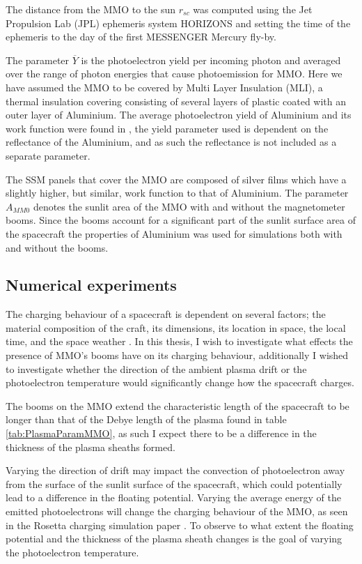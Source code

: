 The distance from the MMO to the sun $r_{sc}$ was computed using the Jet Propulsion Lab (JPL) ephemeris system HORIZONS and setting the time of the ephemeris to the day of the first MESSENGER Mercury fly-by.

The parameter $\overline{Y}$ is the photoelectron yield per incoming photon and averaged over the range of photon energies that cause photoemission for MMO. Here we have assumed the MMO to be covered by Multi Layer Insulation (MLI), a thermal insulation covering consisting of several layers of plastic coated with an outer layer of Aluminium. The average photoelectron yield of Aluminium and its work function were found in \parencite{Feuerbacher1972}, the yield parameter used is dependent on the reflectance of the Aluminium, and as such the reflectance is not included as a separate parameter. 

The SSM panels that cover the MMO are composed of silver films which have a slightly higher, but similar, work function to that of Aluminium. The parameter $A_{MM0}$ denotes the sunlit area of the MMO with and without the magnetometer booms. Since the booms account for a significant part of the sunlit surface area of the spacecraft the properties of Aluminium was used for simulations both with and without the booms.



\subsection{Numerical experiments}

The charging behaviour of a spacecraft is dependent on several factors; the material composition of the craft, its dimensions, its location in space, the local time, and the space weather \parencite{LAI2019} . In this thesis, I wish to investigate what effects the presence of MMO's booms have on its charging behaviour, additionally I wished to investigate whether the direction of the ambient plasma drift or the photoelectron temperature would significantly change how the spacecraft charges.

The booms on the MMO extend the characteristic length of the spacecraft to be longer than that of the Debye length of the plasma found in table \ref{tab:PlasmaParamMMO}, as such I expect there to be a difference in the thickness of the plasma sheaths formed. 

Varying the direction of drift may impact the convection of photoelectron away from the surface of the sunlit surface of the spacecraft, which could potentially lead to a difference in the floating potential. Varying the average energy of the emitted photoelectrons will change the charging behaviour of the MMO, as seen in the Rosetta charging simulation paper \parencite{Sjogren2012}. To observe to what extent the floating potential and the thickness of the plasma sheath changes is the goal of varying the photoelectron temperature. 


